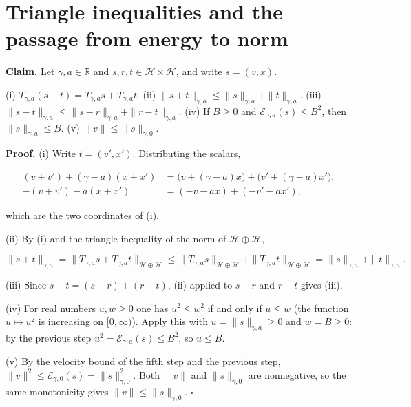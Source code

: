 \documentclass[11pt,a4paper]{article}
\begin{document}
\section{\texorpdfstring{Triangle inequalities and the passage from energy to norm}{Triangle inequalities and the passage from energy to norm}}


\textbf{Claim.} Let \(\gamma,a\in\mathbb R\) and \(s,r,t\in \mathcal H\times \mathcal H\), and write \(s=(v,x)\).




(i) \(T_{\gamma,a}(s+t)=T_{\gamma,a}s+T_{\gamma,a}t\).
(ii) \(\|s+t\|_{\gamma,a}\le\|s\|_{\gamma,a}+\|t\|_{\gamma,a}\).
(iii) \(\|s-t\|_{\gamma,a}\le\|s-r\|_{\gamma,a}+\|r-t\|_{\gamma,a}\).
(iv) If \(B\ge0\) and \(\mathcal E_{\gamma,a}(s)\le B^2\), then \(\|s\|_{\gamma,a}\le B\).
(v) \(\|v\|\le\|s\|_{\gamma,0}\).




\textbf{Proof.} (i) Write \(t=(v',x')\). Distributing the scalars,


\[\begin{aligned}
(v+v')+(\gamma-a)(x+x')&=\bigl(v+(\gamma-a)x\bigr)+\bigl(v'+(\gamma-a)x'\bigr),\\
-(v+v')-a(x+x')&=(-v-ax)+(-v'-ax'),
\end{aligned}\]


which are the two coordinates of (i).




(ii) By (i) and the triangle inequality of the norm of \(\mathcal H\oplus \mathcal H\),


\[\|s+t\|_{\gamma,a}=\|T_{\gamma,a}s+T_{\gamma,a}t\|_{\mathcal H\oplus \mathcal H}\le\|T_{\gamma,a}s\|_{\mathcal H\oplus \mathcal H}+\|T_{\gamma,a}t\|_{\mathcal H\oplus \mathcal H}=\|s\|_{\gamma,a}+\|t\|_{\gamma,a}.\]


(iii) Since \(s-t=(s-r)+(r-t)\), (ii) applied to \(s-r\) and \(r-t\) gives (iii).




(iv) For real numbers \(u,w\ge0\) one has \(u^2\le w^2\) if and only if \(u\le w\) (the function \(u\mapsto u^2\) is increasing on \([0,\infty)\)). Apply this with \(u=\|s\|_{\gamma,a}\ge0\) and \(w=B\ge0\): by the previous step \(u^2=\mathcal E_{\gamma,a}(s)\le B^2\), so \(u\le B\).




(v) By the velocity bound of the fifth step and the previous step, \(\|v\|^2\le\mathcal E_{\gamma,0}(s)=\|s\|_{\gamma,0}^2\). Both \(\|v\|\) and \(\|s\|_{\gamma,0}\) are nonnegative, so the same monotonicity gives \(\|v\|\le\|s\|_{\gamma,0}\). \(\square\)
\end{document}
